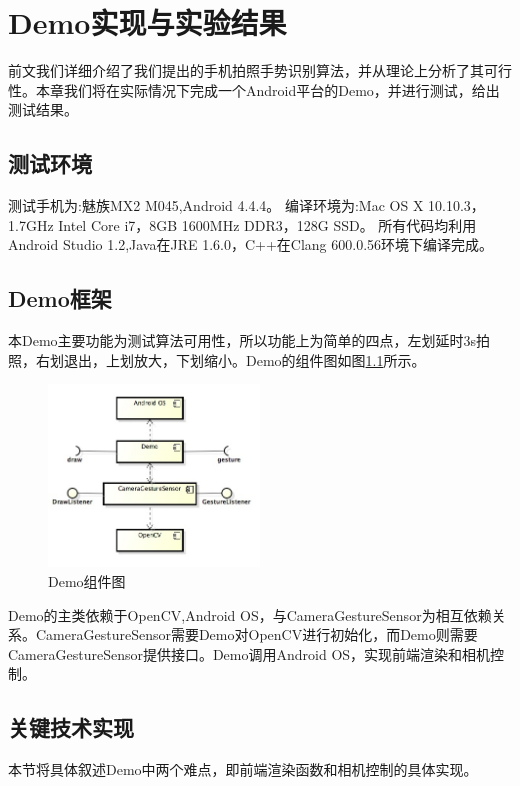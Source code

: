 \documentclass{XDBAthesis}
\begin{document}
\else
\fi
\chapter{Demo实现与实验结果}
前文我们详细介绍了我们提出的手机拍照手势识别算法，并从理论上分析了其可行性。本章我们将在实际情况下完成一个Android平台的Demo，并进行测试，给出测试结果。
\section{测试环境}
测试手机为:魅族MX2 M045,Android 4.4.4。
编译环境为:Mac OS X 10.10.3，1.7GHz Intel Core i7，8GB 1600MHz DDR3，128G SSD。
所有代码均利用Android Studio 1.2,Java在JRE 1.6.0，C++在Clang 600.0.56环境下编译完成。
\section{Demo框架}
本Demo主要功能为测试算法可用性，所以功能上为简单的四点，左划延时3s拍照，右划退出，上划放大，下划缩小。Demo的组件图如图\ref{fg:demo}所示。
\begin{figure}[htb]
    \centering
    \includegraphics[width=0.5\textwidth ]{figure/demo}
    \caption{Demo组件图}
    \label{fg:demo}
\end{figure}
Demo的主类依赖于OpenCV,Android OS，与CameraGestureSensor为相互依赖关系。CameraGestureSensor需要Demo对OpenCV进行初始化，而Demo则需要CameraGestureSensor提供接口。Demo调用Android OS，实现前端渲染和相机控制。
\section{关键技术实现}
本节将具体叙述Demo中两个难点，即前端渲染函数和相机控制的具体实现。
\end{document}
